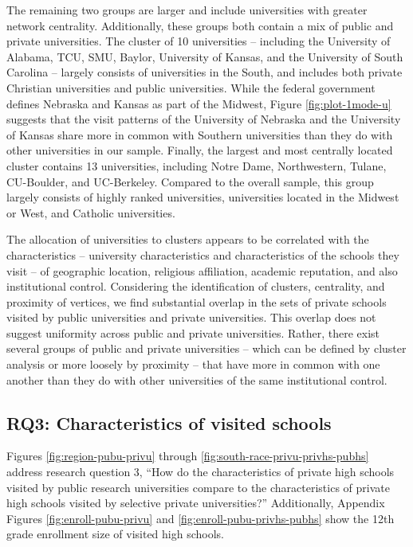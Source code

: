 \documentclass[
  12pt,
]{article}
\begin{document}
The remaining two groups are larger and include universities with greater network centrality. Additionally, these groups both contain a mix of public and private universities. The cluster of 10 universities -- including the University of Alabama, TCU, SMU, Baylor, University of Kansas, and the University of South Carolina -- largely consists of universities in the South, and includes both private Christian universities and public universities. While the federal government defines Nebraska and Kansas as part of the Midwest, Figure \ref{fig:plot-1mode-u} suggests that the visit patterns of the University of Nebraska and the University of Kansas share more in common with Southern universities than they do with other universities in our sample. Finally, the largest and most centrally located cluster contains 13 universities, including Notre Dame, Northwestern, Tulane, CU-Boulder, and UC-Berkeley. Compared to the overall sample, this group largely consists of highly ranked universities, universities located in the Midwest or West, and Catholic universities.

The allocation of universities to clusters appears to be correlated with the characteristics -- university characteristics and characteristics of the schools they visit -- of geographic location, religious affiliation, academic reputation, and also institutional control. Considering the identification of clusters, centrality, and proximity of vertices, we find substantial overlap in the sets of private schools visited by public universities and private universities. This overlap does not suggest uniformity across public and private universities. Rather, there exist several groups of public and private universities -- which can be defined by cluster analysis or more loosely by proximity -- that have more in common with one another than they do with other universities of the same institutional control.

\subsection{RQ3: Characteristics of visited schools}\label{rq3-characteristics-of-visited-schools}

Figures \ref{fig:region-pubu-privu} through \ref{fig:south-race-privu-privhs-pubhs} address research question 3, ``How do the characteristics of private high schools visited by public research universities compare to the characteristics of private high schools visited by selective private universities?'' Additionally, Appendix Figures \ref{fig:enroll-pubu-privu} and \ref{fig:enroll-pubu-privhs-pubhs} show the 12th grade enrollment size of visited high schools.
\end{document}
